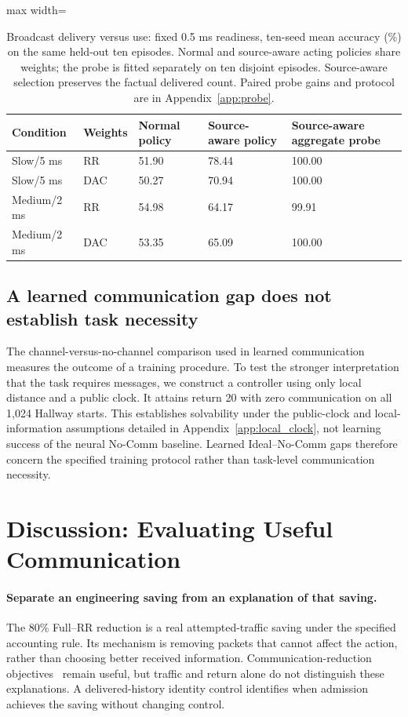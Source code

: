 \documentclass[10pt]{article}
\begin{document}
\begin{table}[htbp]\centering\footnotesize
\caption{Broadcast delivery versus use: fixed 0.5 ms readiness, ten-seed mean accuracy (\%) on the same held-out ten episodes. Normal and source-aware acting policies share weights; the probe is fitted separately on ten disjoint episodes. Source-aware selection preserves the factual delivered count. Paired probe gains and protocol are in Appendix~\ref{app:probe}.}\label{tab:broadcast_use}
\vspace{3mm}
\begin{adjustbox}{max width=\linewidth}\begin{tabular}{lllll}\toprule
Condition & Weights & Normal policy & Source-aware policy & Source-aware aggregate probe\\\midrule
Slow/5 ms & RR & 51.90 & 78.44 & 100.00\\
Slow/5 ms & DAC & 50.27 & 70.94 & 100.00\\
Medium/2 ms & RR & 54.98 & 64.17 & 99.91\\
Medium/2 ms & DAC & 53.35 & 65.09 & 100.00\\
\bottomrule\end{tabular}\end{adjustbox}\end{table}

\subsection{A learned communication gap does not establish task necessity}
The channel-versus-no-channel comparison used in learned communication~\citep{foerster2016learning,sukhbaatar2016learning} measures the outcome of a training procedure. To test the stronger interpretation that the task requires messages, we construct a controller using only local distance and a public clock. It attains return 20 with zero communication on all 1,024 Hallway starts. This establishes solvability under the public-clock and local-information assumptions detailed in Appendix~\ref{app:local_clock}, not learning success of the neural No-Comm baseline. Learned Ideal--No-Comm gaps therefore concern the specified training protocol rather than task-level communication necessity.


\section{Discussion: Evaluating Useful Communication}
\paragraph{Separate an engineering saving from an explanation of that saving.}
The 80\% Full--RR reduction is a real attempted-traffic saving under the specified accounting rule. Its mechanism is removing packets that cannot affect the action, rather than choosing better received information. Communication-reduction objectives~\citep{zhang2019efficient,zhang2020succinct} remain useful, but traffic and return alone do not distinguish these explanations. A delivered-history identity control identifies when admission achieves the saving without changing control.
\end{document}
